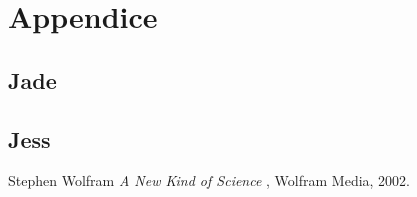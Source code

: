 \documentclass[runningheads,a4paper]{llncs}
\begin{document}
\section{Appendice}
\subsection{Jade}
\subsection{Jess}

%
%
\begin{thebibliography}{1}
 Stephen Wolfram \emph{A New Kind of Science
}, Wolfram Media, 2002.
\end{thebibliography}
\end{document}
